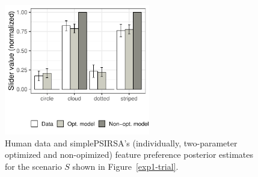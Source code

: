 \documentclass[10pt,a4paper]{article}
\begin{document}
\begin{figure}[ht!]
	\centering
	\includegraphics[width=2.5in]{images/december_barplot_x4.pdf}
	\caption{Human data and simplePSIRSA's (individually, two-parameter optimized and non-opimized) feature preference posterior estimates for the scenario $S$ shown in Figure~\ref{exp1-trial}.}\label{barplot_x4}
\end{figure}

\end{document}
